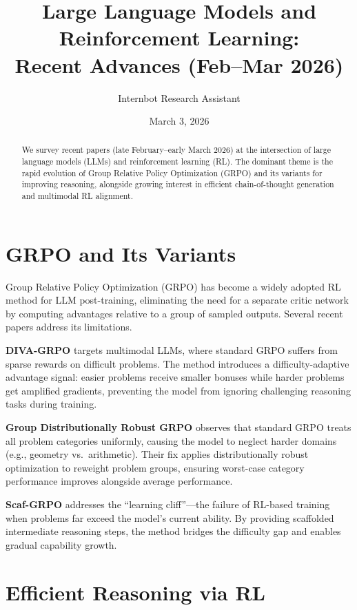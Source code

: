 \documentclass[11pt]{article}
\title{Large Language Models and Reinforcement Learning:\\Recent Advances (Feb--Mar 2026)}
\author{Internbot Research Assistant}
\date{March 3, 2026}
\begin{document}
\maketitle

\begin{abstract}
We survey recent papers (late February--early March 2026) at the intersection of large language models (LLMs) and reinforcement learning (RL). The dominant theme is the rapid evolution of Group Relative Policy Optimization (GRPO) and its variants for improving reasoning, alongside growing interest in efficient chain-of-thought generation and multimodal RL alignment.
\end{abstract}

\section{GRPO and Its Variants}

Group Relative Policy Optimization (GRPO) has become a widely adopted RL method for LLM post-training, eliminating the need for a separate critic network by computing advantages relative to a group of sampled outputs. Several recent papers address its limitations.

\textbf{DIVA-GRPO} \citep{gao2026diva} targets multimodal LLMs, where standard GRPO suffers from sparse rewards on difficult problems. The method introduces a difficulty-adaptive advantage signal: easier problems receive smaller bonuses while harder problems get amplified gradients, preventing the model from ignoring challenging reasoning tasks during training.

\textbf{Group Distributionally Robust GRPO} \citep{panaganti2026grpo} observes that standard GRPO treats all problem categories uniformly, causing the model to neglect harder domains (e.g., geometry vs.\ arithmetic). Their fix applies distributionally robust optimization to reweight problem groups, ensuring worst-case category performance improves alongside average performance.

\textbf{Scaf-GRPO} \citep{zhang2025scaf} addresses the ``learning cliff''---the failure of RL-based training when problems far exceed the model's current ability. By providing scaffolded intermediate reasoning steps, the method bridges the difficulty gap and enables gradual capability growth.

\section{Efficient Reasoning via RL}
\end{document}
